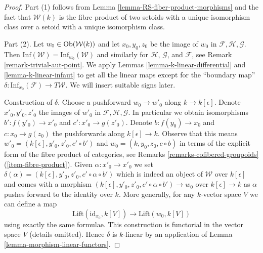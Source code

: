 \begin{proof}
Part (1) follows from Lemma \ref{lemma-RS-fiber-product-morphisms}
and the fact that $\mathcal{W}(k)$ is the fibre product of
two setoids with a unique isomorphism class over a setoid with
a unique isomorphism class.

\medskip\noindent
Part (2). Let $w_0 \in \mathop{\mathrm{Ob}}\nolimits(\mathcal{W}(k))$ and let $x_0, y_0, z_0$ be
the image of $w_0$ in $\mathcal{F}, \mathcal{H}, \mathcal{G}$.
Then $\text{Inf}(\mathcal{W}) = \text{Inf}_{w_0}(\mathcal{W})$
and similarly for $\mathcal{H}$, $\mathcal{G}$, and $\mathcal{F}$, see
Remark \ref{remark-trivial-aut-point}.
We apply Lemmas \ref{lemma-k-linear-differential} and
\ref{lemma-k-linear-infaut} to get all the linear maps
except for the ``boundary map''
$\delta : \text{Inf}_{x_0}(\mathcal{F}) \to T\mathcal{W}$.
We will insert suitable signs later.

\medskip\noindent
Construction of $\delta$. Choose a pushforward $w_0 \to w'_0$ along
$k \to k[\epsilon]$. Denote $x'_0, y'_0, z'_0$ the images of $w'_0$ in
$\mathcal{F}, \mathcal{H}, \mathcal{G}$. In particular
we obtain isomorphisms $b' : f(y'_0) \to x'_0$ and $c' : x'_0 \to g(z'_0)$.
Denote $b : f(y_0) \to x_0$ and $c : x_0 \to g(z_0)$ the pushforwards
along $k[\epsilon] \to k$. Observe that this means
$w'_0 = (k[\epsilon], y'_0, z'_0, c' \circ b')$ and
$w_0 = (k, y_0, z_0, c \circ b)$ in terms of the explicit form
of the fibre product of categories,
see Remarks \ref{remarks-cofibered-groupoids} (\ref{item-fibre-product}).
Given $\alpha : x'_0 \to x'_0$ we set
$\delta(\alpha) = (k[\epsilon], y'_0, z'_0, c' \circ \alpha \circ b')$
which is indeed an object of $\mathcal{W}$ over $k[\epsilon]$ and comes
with a morphism $(k[\epsilon], y'_0, z'_0, c' \circ \alpha \circ b') \to w_0$
over $k[\epsilon] \to k$ as $\alpha$ pushes forward to the identity over $k$.
More generally, for any $k$-vector space $V$ we can define a map
$$
\text{Lift}(\text{id}_{x_0}, k[V])
\longrightarrow
\text{Lift}(w_0, k[V])
$$
using exactly the same formulae. This construction is functorial
in the vector space $V$ (details omitted). Hence $\delta$ is $k$-linear
by an application of
Lemma \ref{lemma-morphism-linear-functors}.


\end{proof}
